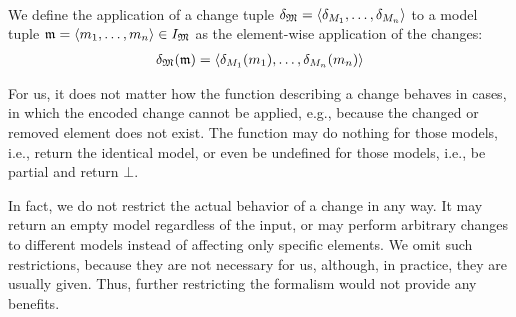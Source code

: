 \begin{definition}[Change]
\begin{align*}
    \end{align*}
    We define the application of a change tuple $\changetuple{\metamodeltuple{M}} = \tupled{\change{\metamodel{M}{1}}, \dots, \change{\metamodel{M}{n}}}$ to a model tuple $\modeltuple{m} = \tupled{\modelsequence{m}{n}} \in \metamodeltupleinstanceset{M}$ as the element-wise application of the changes:
    \begin{align*}
        \changetuple{\metamodeltuple{M}}(\modeltuple{m}) = \tupled{\change{\metamodel{M}{1}}(\model{m}{1}), \dots, \change{\metamodel{M}{n}}(\model{m}{n})}
    \end{align*}
\end{definition}

For us, it does not matter how the function describing a change behaves in cases, in which the encoded change cannot be applied, e.g., because the changed or removed element does not exist. The function may do nothing for those models, i.e., return the identical model, or even be undefined for those models, i.e., be partial and return $\bot$.

In fact, we do not restrict the actual behavior of a change in any way.
It may return an empty model regardless of the input, or may perform arbitrary changes to different models instead of affecting only specific elements.
We omit such restrictions, because they are not necessary for us, although, in practice, they are usually given.
Thus, further restricting the formalism would not provide any benefits.

